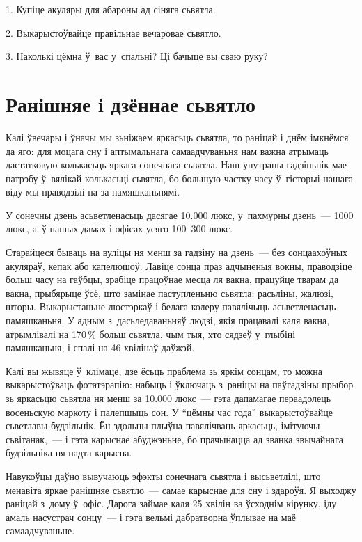 1. Купіце акуляры для абароны ад сіняга сьвятла.

2. Выкарыстоўвайце правільнае вечаровае сьвятло.

3. Наколькі цёмна ў~вас у~спальні? Ці бачыце вы сваю руку?


\section{Ранішняе і дзённае сьвятло}

Калі ўвечары і ўначы мы зьніжаем яркасьць сьвятла, то раніцай і днём імкнёмся да яго: для моцага сну і аптымальнага самаадчуваньня нам важна атрымаць дастатковую колькасьць яркага сонечнага сьвятла. Наш унутраны гадзіньнік мае патрэбу ў~вялікай колькасьці сьвятла, бо большую частку часу ў~гісторыі нашага віду мы праводзілі па-за памяшканьнямі.

У сонечны дзень асьветленасьць дасягае 10.000 люкс, у~пахмурны дзень~--- 1000 люкс, а~ў нашых дамах і офісах усяго 100--300 люкс.

Старайцеся бываць на вуліцы ня менш за гадзіну на дзень~--- без сонцаахоўных акуляраў, кепак або капелюшоў. Лавіце сонца праз адчыненыя вокны, праводзіце больш часу на гаўбцы, зрабіце працоўнае месца ля вакна, працуйце тварам да вакна, прыбярыце ўсё, што замінае паступленьню сьвятла: расьліны, жалюзі, шторы. Выкарыстаньне люстэркаў і белага колеру павялічыць асьветленасьць памяшканьня. У адным з~дасьледаваньняў людзі, якія працавалі каля вакна, атрымлівалі на 170\,\% больш сьвятла, чым тыя, хто сядзеў у~глыбіні памяшканьня, і спалі на 46 хвілінаў даўжэй.

Калі вы жывяце ў~клімаце, дзе ёсьць праблема зь яркім сонцам, то можна выкарыстоўваць фотатэрапію: набыць і ўключаць з~раніцы на паўгадзіны прыбор зь яркасьцю сьвятла ня менш за 10.000 люкс~--- гэта дапамагае пераадолець восеньскую маркоту і палепшыць сон. У ``цёмны час года'' выкарыстоўвайце сьветлавы будзільнік. Ён здольны плыўна павялічваць яркасьць, імітуючы сьвітанак,~--- і гэта карыснае абуджэньне, бо прачынацца ад званка звычайнага будзільніка ня надта карысна.

Навукоўцы даўно вывучаюць эфэкты сонечнага сьвятла і высьветлілі, што менавіта яркае ранішняе сьвятло~--- самае карыснае для сну і здароўя. Я выходжу раніцай з~дому ў~офіс. Дарога займае каля 25 хвілін ва ўсходнім кірунку, іду амаль насустрач сонцу~--- і гэта вельмі дабратворна ўплывае на маё самаадчуваньне.

